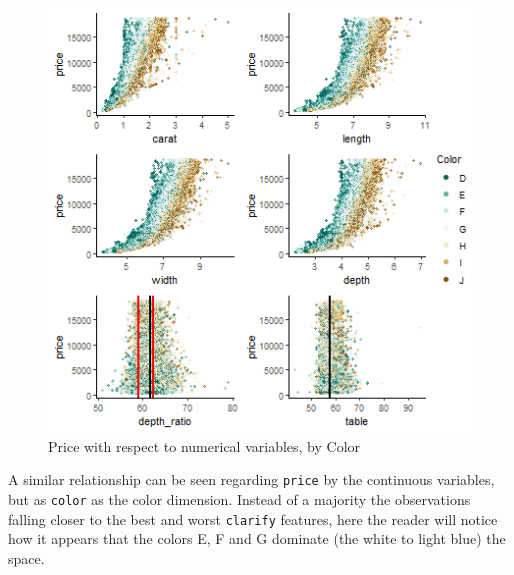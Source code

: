 \documentclass[
  paper=a4,
  ,captions=tableheading
]{scrartcl}
\begin{document}
\begin{figure}[H]

{\centering \includegraphics[width=\linewidth,]{Diamonds_PDF_files/figure-latex/Price by X and Color-1} 

}

\caption{Price with respect to numerical variables, by Color}\label{fig:Price by X and Color}
\end{figure}

A similar relationship can be seen regarding \texttt{price} by the
continuous variables, but as \texttt{color} as the color dimension.
Instead of a majority the observations falling closer to the best and
worst \texttt{clarify} features, here the reader will notice how it
appears that the colors E, F and G dominate (the white to light blue)
the space.
\end{document}
